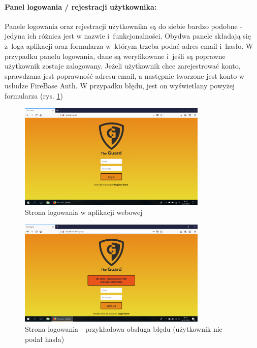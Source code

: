 \paragraph{Panel logowania / rejestracji użytkownika:} Panele logowania oraz rejestracji użytkownika są do siebie bardzo podobne - jedyna ich różnica jest w nazwie i~funkcjonalności. Obydwa panele składają się z~loga aplikacji oraz formularza w~którym trzeba podać adres email i~hasło. W przypadku panelu logowania, dane są weryfikowane i~jeśli są poprawne użytkownik zostaje zalogowany. Jeżeli użytkownik chce zarejestrować konto, sprawdzana jest poprawność adresu email, a następnie tworzone jest konto w usłudze FireBase Auth. W przypadku błędu, jest on wyświetlany powyżej formularza (rys. \ref{web_login})
\begin{figure}[ht]
	\centering
	\includegraphics[width=9cm]{web_screenshots/login.png}
	\caption{Strona logowania w aplikacji webowej}
	\label{web_login}
\end{figure}
\begin{figure}[ht]
	\centering
	\includegraphics[width=9cm]{web_screenshots/error.png}
	\caption{Strona logowania - przykładowa obsługa błędu (użytkownik nie podał hasła)}
	\label{web_login_error}
\end{figure}
